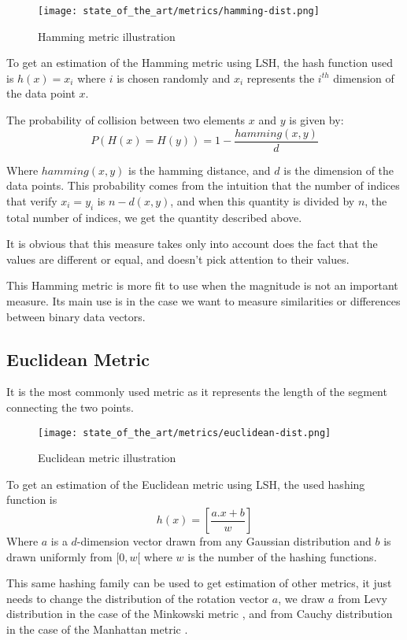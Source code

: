 \begin{figure}[h]
    \centering
    \texttt{[image: state\_of\_the\_art/metrics/hamming-dist.png]}
    \caption{Hamming metric illustration}
    \label{fig:hamming_metric}
\end{figure}

To get an estimation of the Hamming metric using LSH, the hash function used is
$h(x) = x_i$ where $i$ is chosen randomly and $x_i$ represents the $i^{th}$
dimension of the data point $x$.

The probability of collision between two elements $x$ and $y$ is given by:
$$
    P(H(x) = H(y) ) = 1 - \frac{hamming(x,y)}{d}
$$

Where $hamming(x, y)$ is the hamming distance, and $d$ is the dimension of the data
points. This probability comes from the intuition that the number of indices
that verify $x_i = y_i$ is $n - d(x, y)$, and when this quantity is divided by
$n$, the total number of indices, we get the quantity described above.

It is obvious that this measure takes only into account does the fact that the
values are different or equal, and doesn't pick attention to their values.

This Hamming metric is more fit to use when the magnitude is not an important
measure. Its main use is in the case we want to measure similarities or
differences between binary data vectors.

\subsection{Euclidean Metric}
\label{subsect:euclidean_metric}
It is the most commonly used metric as it represents the length of the segment
connecting the two points.
\begin{figure}[h]
    \centering
    \texttt{[image: state\_of\_the\_art/metrics/euclidean-dist.png]}
    \caption{Euclidean metric illustration}
    \label{fig:euclidean_metric}
\end{figure}

To get an estimation of the Euclidean metric using LSH, the used hashing
function is
$$
    h(x) = [\frac{a. x + b}{w}]
$$
Where $a$ is a $d$-dimension vector drawn from any Gaussian distribution and $b$
is drawn uniformly from $[0, w[$ where $w$ is the number of the hashing
functions.

This same hashing family can be used to get estimation of other metrics, it just
needs to change the distribution of the rotation vector $a$, we draw $a$ from
Levy distribution in the case of the Minkowski metric \citep{minkowski_2019},
and from Cauchy distribution in the case of the Manhattan metric
\citep{manhattan_2018}.

